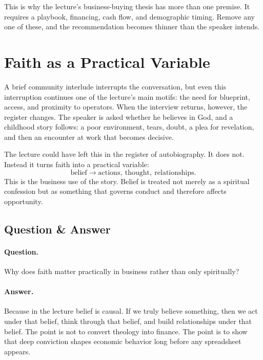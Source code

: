 This is why the lecture's business-buying thesis has more than one premise. It requires a playbook, financing, cash flow, and demographic timing. Remove any one of these, and the recommendation becomes thinner than the speaker intends.

\section{Faith as a Practical Variable}

A brief community interlude interrupts the conversation, but even this interruption continues one of the lecture's main motifs: the need for blueprint, access, and proximity to operators. When the interview returns, however, the register changes. The speaker is asked whether he believes in God, and a childhood story follows: a poor environment, tears, doubt, a plea for revelation, and then an encounter at work that becomes decisive.

The lecture could have left this in the register of autobiography. It does not. Instead it turns faith into a practical variable:
\begin{equation}
\text{belief} \to \text{actions},\ \text{thought},\ \text{relationships}.
\end{equation}
This is the business use of the story. Belief is treated not merely as a spiritual confession but as something that governs conduct and therefore affects opportunity.

\subsection{Question \& Answer}

\paragraph{Question.} Why does faith matter practically in business rather than only spiritually?

\paragraph{Answer.} Because in the lecture belief is causal. If we truly believe something, then we act under that belief, think through that belief, and build relationships under that belief. The point is not to convert theology into finance. The point is to show that deep conviction shapes economic behavior long before any spreadsheet appears.

